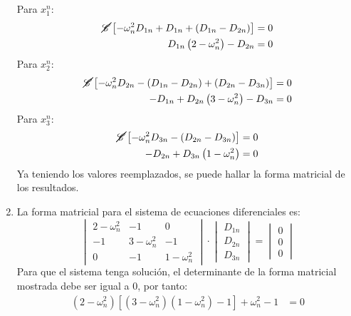 \begin{multicols}{2}
\begin{enumerate}[leftmargin=15pt]
    Para $x^{n}_{1}$:
    \begin{align*}
        \cancel{\mathscr{C}}\left[-\omega^{2}_{n} D_{1n}  + D_{1n} + (D_{1n} - D_{2n})\right] &= 0\\
        D_{1n} \left(2 - \omega^{2}_{n}\right) - D_{2n} &= 0
    \end{align*}
    Para $x^{n}_{2}$:
    \begin{align*}
        \cancel{\mathscr{C}} \left[-\omega^{2}_{n} D_{2n} - \left(D_{1n} - D_{2n}\right) + \left(D_{2n} - D_{3n}\right)\right] &= 0\\
        - D_{1n} + D_{2n}\left(3 - \omega^{2}_{n}\right) - D_{3n} &= 0
    \end{align*}
    Para $x^{n}_{3}$:
    \begin{align*}
        \cancel{\mathscr{C}} \left[-\omega^{2}_{n} D_{3n} - \left(D_{2n} - D_{3n}\right)\right] &= 0\\
        - D_{2n} + D_{3n}\left(1 - \omega^{2}_{n}\right) &= 0
    \end{align*}
    Ya teniendo los valores reemplazados, se puede hallar la forma matricial de los resultados.
    \item La \textcolor{rojo}{forma matricial} para el sistema de ecuaciones diferenciales es:
    \begin{equation*}
        \begin{vmatrix}
        2 - \omega^{2}_{n} & -1 & 0\\
        -1 & 3 - \omega^{2}_{n} & -1\\
        0 & -1 & 1 - \omega^{2}_{n}
        \end{vmatrix}
        \cdot
        \begin{vmatrix}
            D_{1n} \\
            D_{2n} \\
            D_{3n} 
        \end{vmatrix}
        =
        \begin{vmatrix}
            0 \\
            0 \\
            0 
        \end{vmatrix}
    \end{equation*}
    Para que el sistema tenga solución, el determinante de la forma matricial mostrada debe ser igual a 0, por tanto:
    \begin{align*}
        \left(2 - \omega^{2}_{n}\right)\left[\left(3 - \omega^{2}_{n}\right)\left(1 - \omega^{2}_{n}\right) - 1\right] + \omega^{2}_{n} - 1 &= 0
    \end{align*}
\end{enumerate}


\end{multicols}

